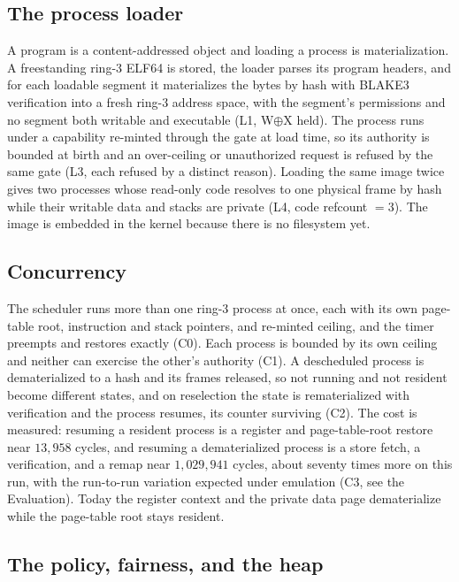 \documentclass[10pt,twocolumn]{article}
\begin{document}
\subsection{The process loader}

A program is a content-addressed object and loading a process is materialization.
A freestanding ring-3 ELF64 is stored, the loader parses its program headers, and
for each loadable segment it materializes the bytes by hash with BLAKE3
verification into a fresh ring-3 address space, with the segment's permissions and
no segment both writable and executable (L1, W$\oplus$X held). The process runs
under a capability re-minted through the gate at load time, so its authority is
bounded at birth and an over-ceiling or unauthorized request is refused by the
same gate (L3, each refused by a distinct reason). Loading the same image twice
gives two processes whose read-only code resolves to one physical frame by hash
while their writable data and stacks are private (L4, code refcount $=3$). The
image is embedded in the kernel because there is no filesystem yet.

\subsection{Concurrency}

The scheduler runs more than one ring-3 process at once, each with its own
page-table root, instruction and stack pointers, and re-minted ceiling, and the
timer preempts and restores exactly (C0). Each process is bounded by its own
ceiling and neither can exercise the other's authority (C1). A descheduled process
is dematerialized to a hash and its frames released, so not running and not
resident become different states, and on reselection the state is rematerialized
with verification and the process resumes, its counter surviving (C2). The cost is
measured: resuming a resident process is a register and page-table-root restore
near $13{,}958$ cycles, and resuming a dematerialized process is a store fetch, a
verification, and a remap near $1{,}029{,}941$ cycles, about seventy times more on
this run, with the run-to-run variation expected under emulation (C3, see the
Evaluation). Today the register context and the private data page dematerialize
while the page-table root stays resident.

\subsection{The policy, fairness, and the heap}
\end{document}
